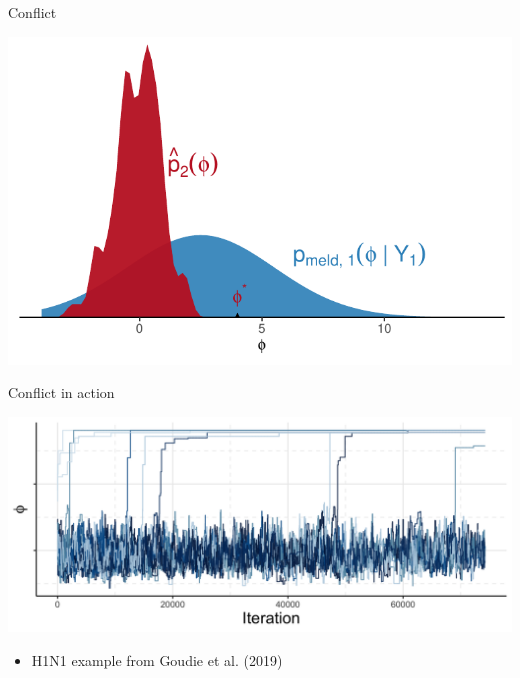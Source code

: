 \documentclass[10pt,ignorenonframetext,]{beamer}
\providecommand{\tightlist}{%
  \setlength{\itemsep}{0pt}\setlength{\parskip}{0pt}}
\begin{document}
\begin{frame}{Conflict}



\begin{center}\includegraphics[width=0.85\linewidth]{figures/conflict} \end{center}

\end{frame}

\begin{frame}{Conflict in action}



\begin{center}\includegraphics[width=1\linewidth]{figures/stage-two-trace-presentation-one} \end{center}

\begin{itemize}
\tightlist
\item
  H1N1 example from Goudie et al. (2019) 
\end{itemize}

\end{frame}
\end{document}

